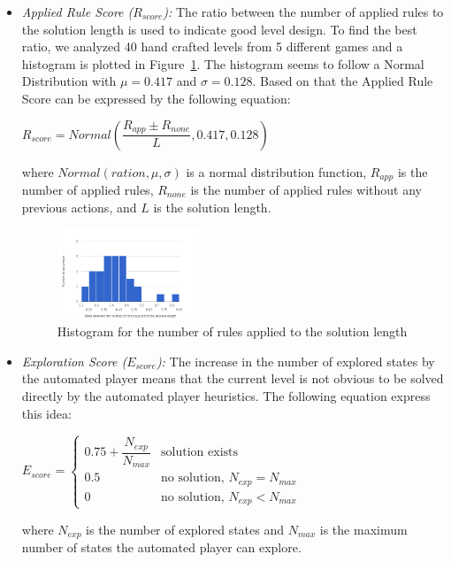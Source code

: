 \documentclass[letterpaper]{article}
\newcommand{\figref}[1]{Figure~\ref{Figure:#1}}
\begin{document}
\begin{itemize}
	\item \emph{Applied Rule Score ($R_{score}$):} The ratio between the number of applied rules to the solution length is used to indicate good level design. To find the best ratio, we analyzed 40 hand crafted levels from 5 different games and a histogram is plotted in \figref{rulesSolutionLengthHistogram}. The histogram seems to follow a Normal Distribution with $\mu = 0.417$ and $\sigma = 0.128$. Based on that the Applied Rule Score can be expressed by the following equation:
	\begin{center}$R_{score} = Normal(\dfrac{R_{app} \pm R_{none}}{L}, 0.417, 0.128)$\end{center}
	where $Normal(ration, \mu, \sigma)$ is a normal distribution function, $R_{app}$ is the number of applied rules, $R_{none}$ is the number of applied rules without any previous actions, and $L$ is the solution length.
	\begin{figure}[ht]
		\centering
		\includegraphics[width=0.4\textwidth]{Images/rulesSolutionLengthHistogram}
		\caption{Histogram for the number of rules applied to the solution length}
		\label{Figure:rulesSolutionLengthHistogram}
	\end{figure}
	
	\item \emph{Exploration Score ($E_{score}$):} The increase in the number of explored states by the automated player means that the current level is not obvious to be solved directly by the automated player heuristics. The following equation express this idea:
	\begin{center}
	$E_{score}= \begin{cases}
	               0.75 + \dfrac{N_{exp}}{N_{max}} & \text{solution exists}\\
	               0.5 & \text{no solution, }N_{exp} = N_{max}\\
	               0 & \text{no solution, }N_{exp} < N_{max}
	           \end{cases}$
	\end{center}
	where $N_{exp}$ is the number of explored states and $N_{max}$ is the maximum number of states the automated player can explore.
\end{itemize}
\end{document}
